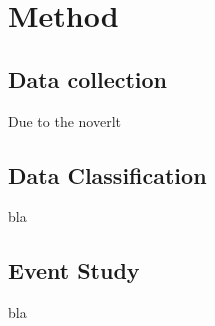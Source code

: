 \chapter{Method}
\label{chap:method}

\section{Data collection}
Due to the noverlt
\section{Data Classification}
bla
\section{Event Study}
bla